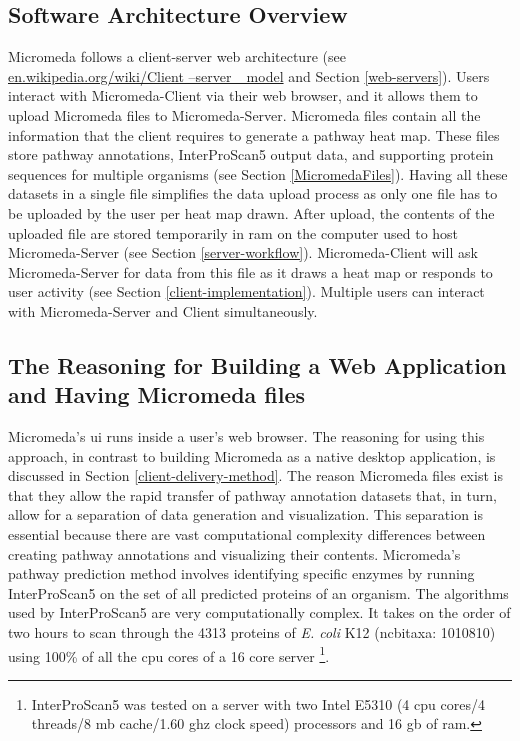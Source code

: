 \subsection{Software Architecture Overview}

Micromeda follows a client-server web architecture \cite{svobodova1985client} (see \href{en.wikipedia.org/wiki/Client–server\_model}{en.wikipedia.org/wiki/Client –server \_model} and Section \ref{web-servers}). Users interact with Micromeda-Client via their web browser, and it allows them to upload Micromeda files to Micromeda-Server. Micromeda files contain all the information that the client requires to generate a pathway heat map. These files store pathway annotations, InterProScan5 output data, and supporting protein sequences for multiple organisms (see Section \ref{MicromedaFiles}). Having all these datasets in a single file simplifies the data upload process as only one file has to be uploaded by the user per heat map drawn. After upload, the contents of the uploaded file are stored temporarily in \gls{ram} on the computer used to host Micromeda-Server (see Section \ref{server-workflow}). Micromeda-Client will ask Micromeda-Server for data from this file as it draws a heat map or responds to user activity (see Section \ref{client-implementation}). Multiple users can interact with Micromeda-Server and Client simultaneously.

\subsection{The Reasoning for Building a Web Application and Having Micromeda files} \label{why-micromeda-files}

Micromeda's \gls{ui} runs inside a user's web browser. The reasoning for using this approach, in contrast to building Micromeda as a native desktop application, is discussed in Section \ref{client-delivery-method}. The reason Micromeda files exist is that they allow the rapid transfer of pathway annotation datasets that, in turn, allow for a separation of data generation and visualization. This separation is essential because there are vast computational complexity differences between creating pathway annotations and visualizing their contents. Micromeda's pathway prediction method involves identifying specific enzymes by running InterProScan5 on the set of all predicted proteins of an organism. The algorithms used by InterProScan5 are very computationally complex. It takes on the order of two hours to scan through the 4313 proteins of \textit{E. coli} K12 (\gls{ncbitaxa}: 1010810) using 100\% of all the \gls{cpu} cores of a 16 core server \footnote{InterProScan5 was tested on a server with two Intel E5310 (4 \gls{cpu} cores/4 threads/8 \gls{mb} cache/1.60 \gls{ghz} clock speed) processors and 16 \gls{gb}  of \gls{ram}.}.

